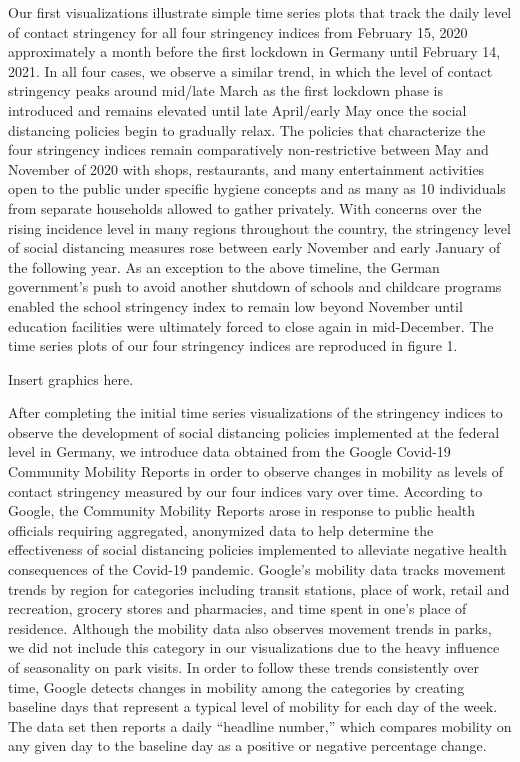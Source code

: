 Our first visualizations illustrate simple time series plots that track the daily level of contact stringency for all four stringency indices from February 15, 2020 approximately a month before the first lockdown in Germany until February 14, 2021. In all four cases, we observe a similar trend, in which the level of contact stringency peaks around mid/late March as the first lockdown phase is introduced and remains elevated until late April/early May once the social distancing policies begin to gradually relax. The policies that characterize the four stringency indices remain comparatively non-restrictive between May and November of 2020 with shops, restaurants, and many entertainment activities open to the public under specific hygiene concepts and as many as 10 individuals from separate households allowed to gather privately. With concerns over the rising incidence level in many regions throughout the country, the stringency level of social distancing measures rose between early November and early January of the following year. As an exception to the above timeline, the German government’s push to avoid another shutdown of schools and childcare programs enabled the school stringency index to remain low beyond November until education facilities were ultimately forced to close again in mid-December. The time series plots of our four stringency indices are reproduced in figure 1.  

Insert graphics here. 

After completing the initial time series visualizations of the stringency indices to observe the development of social distancing policies implemented at the federal level in Germany, we introduce data obtained from the Google Covid-19 Community Mobility Reports in order to observe changes in mobility as levels of contact stringency measured by our four indices vary over time. According to Google, the Community Mobility Reports arose in response to public health officials requiring aggregated, anonymized data to help determine the effectiveness of social distancing policies implemented to alleviate negative health consequences of the Covid-19 pandemic. Google’s mobility data tracks movement trends by region for categories including transit stations, place of work, retail and recreation, grocery stores and pharmacies, and time spent in one’s place of residence. Although the mobility data also observes movement trends in parks, we did not include this category in our visualizations due to the heavy influence of seasonality on park visits. In order to follow these trends consistently over time, Google detects changes in mobility among the categories by creating baseline days that represent a typical level of mobility for each day of the week. The data set then reports a daily “headline number,” which compares mobility on any given day to the baseline day as a positive or negative percentage change. 

